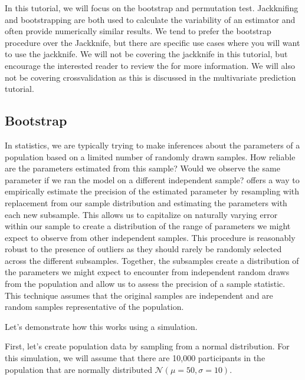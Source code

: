 \documentclass[letterpaper,10pt,english]{sphinxmanual}
\begin{document}
In this tutorial, we will focus on the bootstrap and permutation test. Jackknifing and bootstrapping are both used to calculate the variability of an estimator and often provide numerically similar results. We tend to prefer the bootstrap procedure over the Jackknife, but there are specific use cases where you will want to use the jackknife. We will not be covering the jackknife in this tutorial, but encourage the interested reader to review the  for more information. We will also not be covering cross\sphinxhyphen{}validation as this is discussed in the multivariate prediction tutorial.


\subsection{Bootstrap}
\label{\detokenize{content/Resampling_Statistics:bootstrap}}
In statistics, we are typically trying to make inferences about the parameters of a population based on a limited number of randomly drawn samples. How reliable are the parameters estimated from this sample? Would we observe the same parameter if we ran the model on a different independent sample?  offers a way to empirically estimate the precision of the estimated parameter by resampling with replacement from our sample distribution and estimating the parameters with each new subsample. This allows us to capitalize on naturally varying error within our sample to create a distribution of the range of parameters we might expect to observe from other independent samples. This procedure is reasonably robust to the presence of outliers as they should rarely be randomly selected across the different subsamples. Together, the subsamples create a distribution of the parameters we might expect to encounter from independent random draws from the population and allow us to assess the precision of a sample statistic. This technique assumes that the original samples are independent and are random samples representative of the population.

Let’s demonstrate how this works using a simulation.

First, let’s create population data by sampling from a normal distribution. For this simulation, we will assume that there are 10,000 participants in the population that are normally distributed \(\mathcal{N}(\mu=50, \sigma=10)\).
\end{document}
